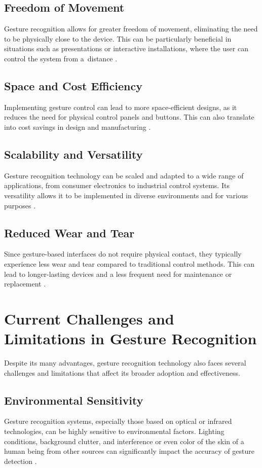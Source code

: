 \subsection{Freedom of Movement}
Gesture recognition allows for greater freedom of movement, eliminating the need to be physically close to the device. This can be particularly beneficial in situations such as presentations or interactive installations, where the user can control the system from a~distance \cite{ZhiHeng2017}.

\subsection{Space and Cost Efficiency}
Implementing gesture control can lead to more space-efficient designs, as it reduces the need for physical control panels and buttons. This can also translate into cost savings in design and manufacturing \cite{Choi2014}.

\subsection{Scalability and Versatility}
Gesture recognition technology can be scaled and adapted to a wide range of applications, from consumer electronics to industrial control systems. Its versatility allows it to be implemented in diverse environments and for various purposes \cite{Jha2018}.

\subsection{Reduced Wear and Tear}
Since gesture-based interfaces do not require physical contact, they typically experience less wear and tear compared to traditional control methods. This can lead to longer-lasting devices and a less frequent need for maintenance or replacement \cite{Yan2012}.

\section{Current Challenges and Limitations in Gesture Recognition}

Despite its many advantages, gesture recognition technology also faces several challenges and limitations that affect its broader adoption and effectiveness.

\subsection{Environmental Sensitivity}
Gesture recognition systems, especially those based on optical or infrared technologies, can be highly sensitive to environmental factors. Lighting conditions, background clutter, and interference or even color of the skin of a human being from other sources can significantly impact the accuracy of gesture detection \cite{Choi2014}.

